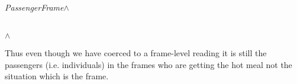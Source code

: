 \begin{ex} 
\begin{subex}

\item \textit{PassengerFrame}\d{$\wedge$} 
 
\item  {} \\ \d{$\wedge$}
 
\item  {}
 
\end{subex} 
   
\end{ex} 
     

Thus even though we have coerced to a frame-level reading
it is still the passengers (i.e. individuals) in the frames who are getting
the hot meal not the situation which is the frame.

